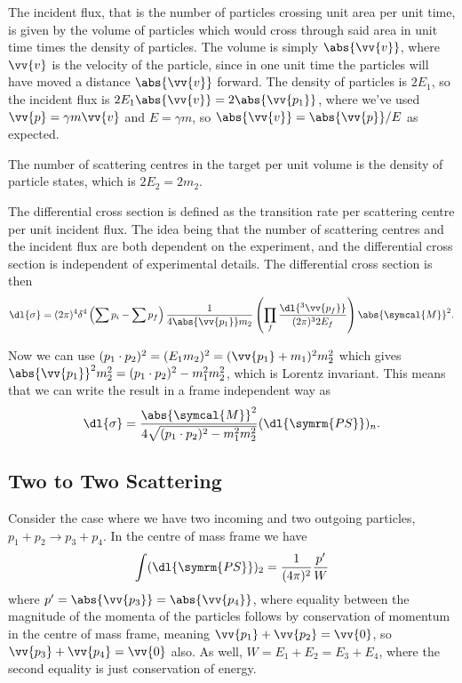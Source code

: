 \documentclass[fleqn]{NotesClass}
\newcommand{\amplitude}{\symcal{M}}
\newcommand{\phaseSpaceMeasure}[1][n]{(\dl{\symrm{PS}})_{#1}}
\begin{document}
    The incident flux, that is the number of particles crossing unit area per unit time, is given by the volume of particles which would cross through said area in unit time times the density of particles.
    The volume is simply \(\abs{\vv{v}}\), where \(\vv{v}\) is the velocity of the particle, since in one unit time the particles will have moved a distance \(\abs{\vv{v}}\) forward.
    The density of particles is \(2E_1\), so the incident flux is \(2E_1\abs{\vv{v}} = 2\abs{\vv{p_1}}\), where we've used \(\vv{p} = \gamma m\vv{v}\) and \(E = \gamma m\), so \(\abs{\vv{v}} = \abs{\vv{p}}/E\) as expected.
    
    The number of scattering centres in the target per unit volume is the density of particle states, which is \(2E_2 = 2m_2\).
    
    The differential cross section is defined as the transition rate per scattering centre per unit incident flux.
    The idea being that the number of scattering centres and the incident flux are both dependent on the experiment, and the differential cross section is independent of experimental details.
    The differential cross section is then
    \begin{equation}
        \dl{\sigma} = (2\pi)^4 \delta^4\left( \sum p_i - \sum p_f \right) \frac{1}{4\abs{\vv{p_1}}m_2} \left( \prod_f \frac{\dl{^3\vv{p_f}}}{(2\pi)^32E_f} \right) \abs{\amplitude}^2.
    \end{equation}
    
    Now we can use \((p_1 \cdot p_2)^2 = (E_1m_2)^2 = (\vv{p_1} + m_1)^2 m_2^2\) which gives \(\abs{\vv{p_1}}^2m_2^2 = (p_1\cdot p_2)^2 - m_1^2 m_2^2\), which is Lorentz invariant.
    This means that we can write the result in a frame independent way as
    \begin{equation}
        \dl{\sigma} = \frac{\abs{\amplitude}^2}{4\sqrt{(p_1 \cdot p_2)^2 - m_1^2 m_2^2}} \phaseSpaceMeasure.
    \end{equation}
    
    \subsection{Two to Two Scattering}
    Consider the case where we have two incoming and two outgoing particles, \(p_1 + p_2 \to p_3 + p_4\).
    In the centre of mass frame we have
    \begin{equation}
        \int \phaseSpaceMeasure[2] = \frac{1}{(4\pi)^2} \frac{p'}{W}
    \end{equation}
    where \(p' = \abs{\vv{p_3}} = \abs{\vv{p_4}}\), where equality between the magnitude of the momenta of the particles follows by conservation of momentum in the centre of mass frame, meaning \(\vv{p_1} + \vv{p_2} = \vv{0}\), so \(\vv{p_3} + \vv{p_4} = \vv{0}\) also.
    As well, \(W = E_1 + E_2 = E_3 + E_4\), where the second equality is just conservation of energy.
    
\end{document}

